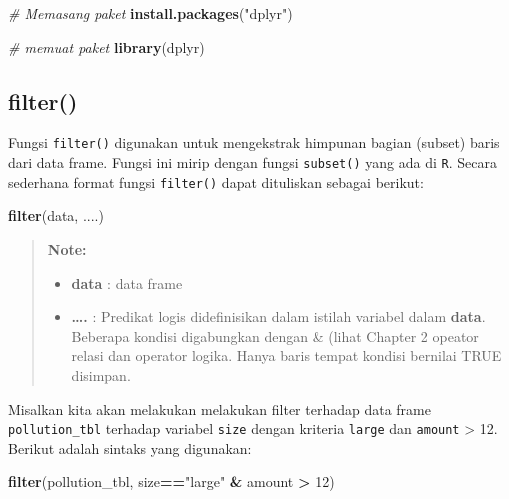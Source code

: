 \documentclass[]{book}
\newenvironment{Shaded}{\begin{snugshade}}{\end{snugshade}}
\newcommand{\KeywordTok}[1]{\textcolor[rgb]{0.13,0.29,0.53}{\textbf{#1}}}
\newcommand{\DecValTok}[1]{\textcolor[rgb]{0.00,0.00,0.81}{#1}}
\newcommand{\StringTok}[1]{\textcolor[rgb]{0.31,0.60,0.02}{#1}}
\newcommand{\CommentTok}[1]{\textcolor[rgb]{0.56,0.35,0.01}{\textit{#1}}}
\newcommand{\OperatorTok}[1]{\textcolor[rgb]{0.81,0.36,0.00}{\textbf{#1}}}
\newcommand{\NormalTok}[1]{#1}
\providecommand{\tightlist}{%
  \setlength{\itemsep}{0pt}\setlength{\parskip}{0pt}}
\begin{document}
\begin{Shaded}
\begin{Highlighting}[]
\CommentTok{# Memasang paket}
\KeywordTok{install.packages}\NormalTok{(}\StringTok{"dplyr"}\NormalTok{)}
\end{Highlighting}
\end{Shaded}

\begin{Shaded}
\begin{Highlighting}[]
\CommentTok{# memuat paket}
\KeywordTok{library}\NormalTok{(dplyr)}
\end{Highlighting}
\end{Shaded}

\subsection{filter()}\label{filter}

Fungsi \texttt{filter()} digunakan untuk mengekstrak himpunan bagian
(subset) baris dari data frame. Fungsi ini mirip dengan fungsi
\texttt{subset()} yang ada di \texttt{R}. Secara sederhana format fungsi
\texttt{filter()} dapat dituliskan sebagai berikut:

\begin{Shaded}
\begin{Highlighting}[]
\KeywordTok{filter}\NormalTok{(data, ....)}
\end{Highlighting}
\end{Shaded}

\begin{quote}
\textbf{Note: }

\begin{itemize}
\tightlist
\item
  \textbf{data} : data frame
\item
  \textbf{\ldots{}.} : Predikat logis didefinisikan dalam istilah
  variabel dalam \textbf{data}. Beberapa kondisi digabungkan dengan \&
  (lihat Chapter 2 opeator relasi dan operator logika. Hanya baris
  tempat kondisi bernilai TRUE disimpan.
\end{itemize}
\end{quote}

Misalkan kita akan melakukan melakukan filter terhadap data frame
\texttt{pollution\_tbl} terhadap variabel \texttt{size} dengan kriteria
\texttt{large} dan \texttt{amount} \textgreater{} 12. Berikut adalah
sintaks yang digunakan:

\begin{Shaded}
\begin{Highlighting}[]
\KeywordTok{filter}\NormalTok{(pollution_tbl, size}\OperatorTok{==}\StringTok{"large"} \OperatorTok{&}\StringTok{ }\NormalTok{amount }\OperatorTok{>}\StringTok{ }\DecValTok{12}\NormalTok{)}
\end{Highlighting}
\end{Shaded}
\end{document}
